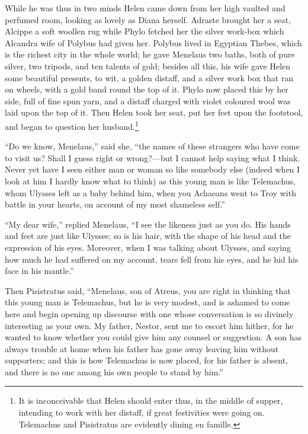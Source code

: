 While he was thus in two minds Helen came down from her high vaulted and
perfumed room, looking as lovely as Diana herself. Adraste brought her a seat,
Alcippe a soft woollen rug while Phylo fetched her the silver work-box which
Alcandra wife of Polybus had given her. Polybus lived in Egyptian Thebes, which
is the richest city in the whole world; he gave Menelaus two baths, both of
pure silver, two tripods, and ten talents of gold; besides all this, his wife
gave Helen some beautiful presents, to wit, a golden distaff, and a silver work
box that ran on wheels, with a gold band round the top of it. Phylo now placed
this by her side, full of fine spun yarn, and a distaff charged with violet
coloured wool was laid upon the top of it. Then Helen took her seat, put her
feet upon the footstool, and began to question her husband.\footnote{It is inconceivable that Helen should enter thus, in the middle of supper,
intending to work with her distaff, if great festivities were going on.
Telemachus and Pisistratus are evidently dining en famille.}

“Do we know, Menelaus,” said she, “the names of these strangers who have come
to visit us? Shall I guess right or wrong?—but I cannot help saying what I
think. Never yet have I seen either man or woman so like somebody else (indeed
when I look at him I hardly know what to think) as this young man is like
Telemachus, whom Ulysses left as a baby behind him, when you Achaeans went to
Troy with battle in your hearts, on account of my most shameless self.”

“My dear wife,” replied Menelaus, “I see the likeness just as you do. His hands
and feet are just like Ulysses; so is his hair, with the shape of his head and
the expression of his eyes. Moreover, when I was talking about Ulysses, and
saying how much he had suffered on my account, tears fell from his eyes, and he
hid his face in his mantle.”

Then Pisistratus said, “Menelaus, son of Atreus, you are right in thinking that
this young man is Telemachus, but he is very modest, and is ashamed to come
here and begin opening up discourse with one whose conversation is so divinely
interesting as your own. My father, Nestor, sent me to escort him hither, for
he wanted to know whether you could give him any counsel or suggestion. A son
has always trouble at home when his father has gone away leaving him without
supporters; and this is how Telemachus is now placed, for his father is absent,
and there is no one among his own people to stand by him.”

